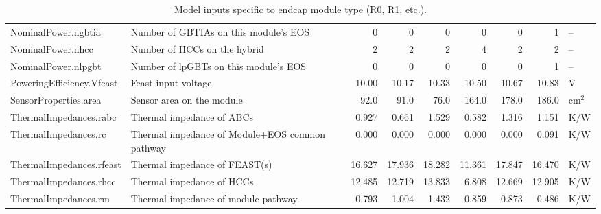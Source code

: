 \begin{table}[ht]
\begin{centering}
{\begin{tabular}{|l|l|r|r|r|r|r|r|l|}
NominalPower.ngbtia       & Number of GBTIAs on this module's EOS          &      0 &      0 &      0 &      0 &      0 &      1 & --     \\ 
NominalPower.nhcc         & Number of HCCs on the hybrid                   &      2 &      2 &      2 &      4 &      2 &      2 & --     \\ 
NominalPower.nlpgbt       & Number of lpGBTs on this module's EOS          &      0 &      0 &      0 &      0 &      0 &      1 & --     \\ 
PoweringEfficiency.Vfeast & Feast input voltage                            &  10.00 &  10.17 &  10.33 &  10.50 &  10.67 &  10.83 & V      \\ 
SensorProperties.area     & Sensor area on the module                      &   92.0 &   91.0 &   76.0 &  164.0 &  178.0 &  186.0 & cm$^2$ \\ 
ThermalImpedances.rabc    & Thermal impedance of ABCs                      &  0.927 &  0.661 &  1.529 &  0.582 &  1.316 &  1.151 & K/W    \\ 
ThermalImpedances.rc      & Thermal impedance of Module+EOS common pathway &  0.000 &  0.000 &  0.000 &  0.000 &  0.000 &  0.091 & K/W    \\ 
ThermalImpedances.rfeast  & Thermal impedance of FEAST(s)                  & 16.627 & 17.936 & 18.282 & 11.361 & 17.847 & 16.470 & K/W    \\ 
ThermalImpedances.rhcc    & Thermal impedance of HCCs                      & 12.485 & 12.719 & 13.833 &  6.808 & 12.669 & 12.905 & K/W    \\ 
ThermalImpedances.rm      & Thermal impedance of module pathway            &  0.793 &  1.004 &  1.432 &  0.859 &  0.873 &  0.486 & K/W    \\ 
\hline\end{tabular}
} %
\end{centering}
\caption{Model inputs specific to endcap module type (R0, R1, etc.).}
\end{table}
